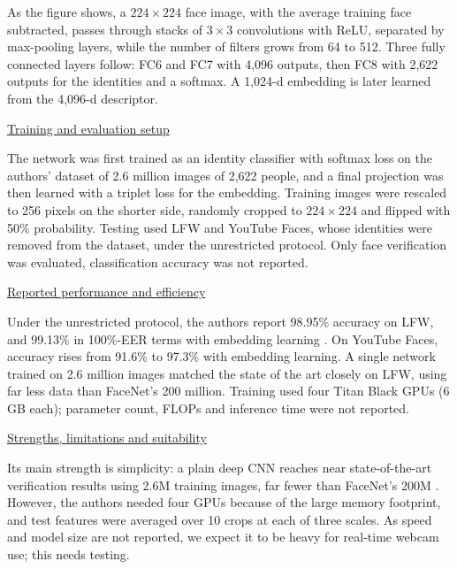 \documentclass[11pt,a4paper,twocolumn]{article}
\begin{document}
As the figure shows, a $224\times224$ face image, with the average training face subtracted, passes through stacks of $3\times3$ convolutions with ReLU, separated by max-pooling layers, while the number of filters grows from 64 to 512. Three fully connected layers follow: FC6 and FC7 with 4,096 outputs, then FC8 with 2,622 outputs for the identities and a softmax. A 1,024-d embedding is later learned from the 4,096-d descriptor.

\noindent\underline{Training and evaluation setup}\par\nopagebreak[4]

The network was first trained as an identity classifier with softmax loss on the authors' dataset of 2.6 million images of 2,622 people, and a final projection was then learned with a triplet loss for the embedding. Training images were rescaled to 256 pixels on the shorter side, randomly cropped to $224\times224$ and flipped with 50\% probability. Testing used LFW and YouTube Faces, whose identities were removed from the dataset, under the unrestricted protocol. Only face verification was evaluated, classification accuracy was not reported.

\noindent\underline{Reported performance and efficiency}\par\nopagebreak[4]

Under the unrestricted protocol, the authors report 98.95\% accuracy on LFW, and 99.13\% in 100\%-EER terms with embedding learning \cite{parkhi2015deep}. On YouTube Faces, accuracy rises from 91.6\% to 97.3\% with embedding learning. A single network trained on 2.6 million images matched the state of the art closely on LFW, using far less data than FaceNet's 200 million. Training used four Titan Black GPUs (6 GB each); parameter count, FLOPs and inference time were not reported.

\noindent\underline{Strengths, limitations and suitability}\par\nopagebreak[4]

Its main strength is simplicity: a plain deep CNN reaches near state-of-the-art verification results using 2.6M training images, far fewer than FaceNet's 200M \cite{parkhi2015deep}. However, the authors needed four GPUs because of the large memory footprint, and test features were averaged over 10 crops at each of three scales. As speed and model size are not reported, we expect it to be heavy for real-time webcam use; this needs testing.

\endgroup


\end{document}
